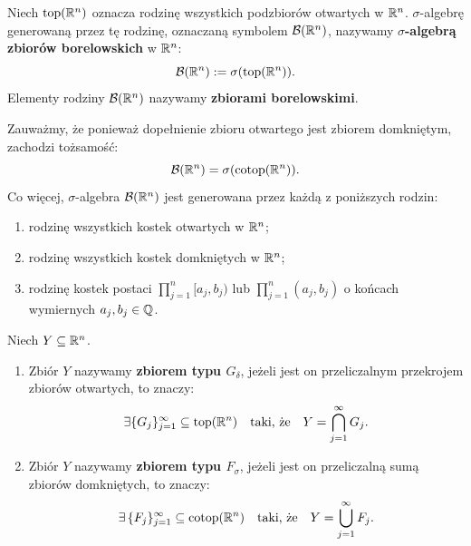 \begin{defi}
    Niech $\mathrm{top}(\mathbb{R}^{n})$ oznacza rodzinę wszystkich podzbiorów otwartych w $\mathbb{R}^{n}$. $\sigma$-algebrę generowaną przez tę rodzinę, oznaczaną symbolem $\mathcal{B}({\mathbb{R}^{n}})$, nazywamy \textbf{$\sigma$-algebrą zbiorów borelowskich} w $\mathbb{R}^{n}$:
    \begin{equation*}
        \mathcal{B}({\mathbb{R}^{n}}) := \sigma(\mathrm{top}(\mathbb{R}^{n})).
    \end{equation*}
    Elementy rodziny $\mathcal{B}({\mathbb{R}^{n}})$ nazywamy \textbf{zbiorami borelowskimi}.
\end{defi}
\begin{uwaga}
    Zauważmy, że ponieważ dopełnienie zbioru otwartego jest zbiorem domkniętym, zachodzi tożsamość: \begin{equation*} \mathcal{B}({\mathbb{R}^{n}}) = \sigma(\mathrm{cotop}(\mathbb{R}^{n})).
    \end{equation*}
    Co więcej, $\sigma$-algebra $\mathcal{B}({\mathbb{R}^{n}})$ jest generowana przez każdą z poniższych rodzin:
    \begin{enumerate}
        \item rodzinę wszystkich kostek otwartych w $\mathbb{R}^{n}$;
        \item rodzinę wszystkich kostek domkniętych w $\mathbb{R}^{n}$;
        \item rodzinę kostek postaci $\prod_{j=1}^n [a_j, b_j)$ lub $\prod_{j=1}^n (a_j, b_j)$ o końcach wymiernych $a_j, b_j \in \mathbb{Q}$.
    \end{enumerate}
\end{uwaga}
\begin{defi}
    Niech $Y \subseteq  \mathbb{R}^{n}$.
    \begin{enumerate}
        \item Zbiór $Y$ nazywamy \textbf{zbiorem typu $G_\delta$}, jeżeli jest on przeliczalnym przekrojem zbiorów otwartych, to znaczy:
              \begin{equation*}
                  \exists \{G_j\}_{j=1}^\infty \subseteq  \mathrm{top}(\mathbb{R}^{n}) \quad \text{taki, że} \quad Y = \bigcap_{j=1}^\infty G_j.
              \end{equation*}
        \item Zbiór $Y$ nazywamy \textbf{zbiorem typu $F_\sigma$}, jeżeli jest on przeliczalną sumą zbiorów domkniętych, to znaczy:
              \begin{equation*}
                  \exists \, \{F_j\}_{j=1}^\infty \subseteq  \mathrm{cotop}(\mathbb{R}^{n}) \quad \text{taki, że} \quad Y = \bigcup_{j=1}^\infty F_j.
              \end{equation*}
    \end{enumerate}
\end{defi}
